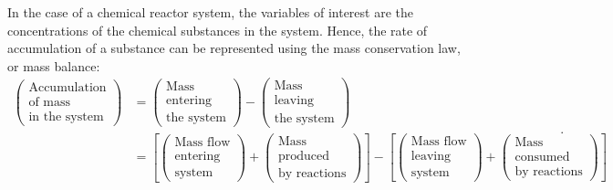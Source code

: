 \documentclass[a4paper,11pt]{book}
\numberwithin{figure}{chapter}
\numberwithin{equation}{chapter}
\numberwithin{table}{chapter}
\theoremstyle{definition}
\begin{document}
In the case of a chemical reactor system, the variables of interest are the concentrations of the chemical substances in the system. Hence, the rate of accumulation of a substance can be represented using the mass conservation law, or mass balance:
\begin{equation} \label{eq:massCons02}
\begin{split}
    \begin{pmatrix}
        \text{Accumulation} \\ \text{of mass} \\ \text{in the system}
    \end{pmatrix} &= 
    \begin{pmatrix}
        \text{Mass} \\ \text{entering} \\ \text{the system}
    \end{pmatrix} - \begin{pmatrix}
        \text{Mass} \\ \text{leaving} \\ \text{the system}
    \end{pmatrix} \\
    &= \left[ \begin{pmatrix}
        \text{Mass flow} \\ \text{entering} \\ \text{system}
    \end{pmatrix} + \begin{pmatrix}
        \text{Mass} \\  \text{produced} \\ \text{by reactions}
    \end{pmatrix} \right] - \left[ \begin{pmatrix}
        \text{Mass flow} \\ \text{leaving} \\ \text{system}
    \end{pmatrix} + \begin{pmatrix}
        \text{Mass} \\ \text{consumed} \\ \text{by reactions}
    \end{pmatrix} \right]
\end{split}
.\end{equation}
\end{document}
